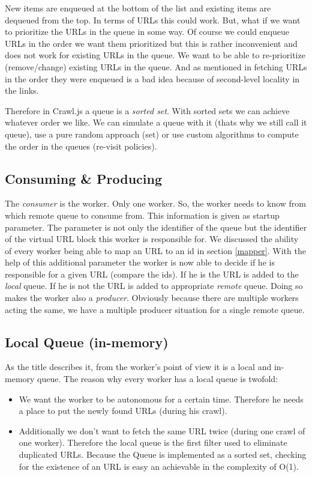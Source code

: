 New items are enqueued at the bottom of the list and existing items are dequeued from the top. In terms of URLs this could work. But, what if we want to prioritize the URLs in the queue in some way. Of course we could enqueue URLs in the order we want them prioritized but this is rather inconvenient and does not work for existing URLs in the queue. We want to be able to re-prioritize (remove/change) existing URLs in the queue. And as mentioned in \cite{hp_crawler} fetching URLs in the order they were enqueued is a bad idea because of second-level locality in the links.

Therefore in Crawl.js a queue is a \emph{sorted set}. With sorted sets we can achieve whatever order we like. We can simulate a queue with it (thats why we still call it queue), use a pure random approach (set) or use custom algorithms to compute the order in the queues (re-visit policies).

\subsection{Consuming \& Producing}
The \emph{consumer} is the worker. Only one worker. So, the worker needs to know from which remote queue to consume from. This information is given as startup parameter. The parameter is not only the identifier of the queue but the identifier of the virtual URL block this worker is responsible for. We discussed the ability of every worker being able to map an URL to an id in section \ref{mapper}. With the help of this additional parameter the worker is now able to decide if he is responsible for a given URL (compare the ids). If he is the URL is added to the \emph{local} queue. If he is not the URL is added to appropriate \emph{remote} queue. Doing so makes the worker also a \emph{producer}. Obviously because there are multiple workers acting the same, we have a multiple producer situation for a single remote queue. 

\subsection{Local Queue (in-memory)}
\label{queues_local}
As the title describes it, from the worker's point of view it is a local and in-memory queue. The reason why every worker has a local queue is twofold:
\begin{itemize}
  \item We want the worker to be autonomous for a certain time. Therefore he needs a place to put the newly found URLs (during his crawl).
  \item Additionally we don't want to fetch the same URL twice (during one crawl of one worker). Therefore the local queue is the first filter used to eliminate duplicated URLs. Because the Queue is implemented as a sorted set, checking for the existence of an URL is easy an achievable in the complexity of O(1).
\end{itemize}

